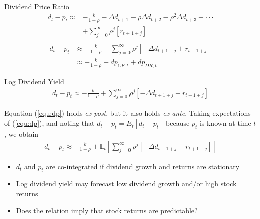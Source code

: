 \documentclass{beamer}
\begin{document}
\begin{frame}{Dividend Price Ratio}
	\begin{align*}
		d_t-p_t \approx & -\frac{k}{1-\rho } -\Delta d_{t+1} -\rho \Delta d_{t+2} -\rho^2 \Delta d_{t+3} - \cdot \cdot \cdot \\
		& + \sum_{j=0}^{\infty }\rho ^{j}\left [ r_{t+1+j} \right ]\\
	\end{align*}
	\begin{align}
		d_t-p_t & \approx  -\frac{k}{1-\rho } + \sum_{j=0}^{\infty }\rho ^{j}\left [-\Delta d_{t+1+j}+ r_{t+1+j} \right ] \\
        & \approx -\frac{k}{1-\rho}+d p_{C F, t}+d p_{D R, t}
	\end{align}
\end{frame}

\begin{frame}{Log Dividend Yield}
	\begin{align}
		d_t-p_t \approx  -\frac{k}{1-\rho } + \sum_{j=0}^{\infty }\rho ^{j}\left [-\Delta d_{t+1+j}+ r_{t+1+j} \right ] \label{equ:dp}
	\end{align}
	
	Equation (\ref{equ:dp}) holds \textit{ex post}, but it also holds \textit{ex ante}. Taking expectations of  (\ref{equ:dp}), and noting that $d_t - p_t = E_t[d_t - p_t] $ because $ p_t $ is known at time $ t $,
	we obtain
	\begin{align*}
		d_t-p_t \approx  -\frac{k}{1-\rho } + \mathbb{E}_t\left [ \sum_{j=0}^{\infty }\rho ^{j}\left [-\Delta d_{t+1+j}+ r_{t+1+j} \right ] \right ]  
	\end{align*}

\end{frame}

\begin{frame}
	\begin{itemize}
		\item $ d_t $ and $ p_t $ are co-integrated if dividend growth and returns are
		stationary
		\item Log dividend yield may forecast low dividend growth and/or
		high stock returns
		\item Does the relation imply that stock returns are predictable?
	\end{itemize}
\end{frame}
\end{document}
